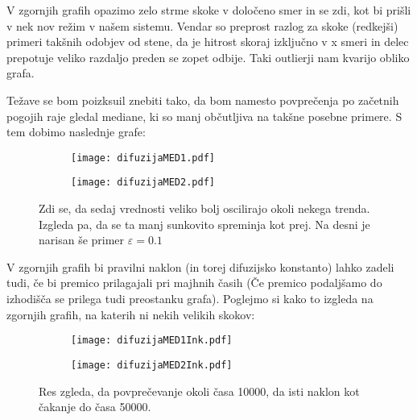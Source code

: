 \documentclass{article}
\begin{document}
V zgornjih grafih opazimo zelo strme skoke v določeno smer in se zdi, kot bi prišli v nek nov režim v našem sistemu. Vendar so preprost razlog za skoke (redkejši) primeri takšnih odobjev od stene, da je hitrost skoraj izključno v x smeri in delec prepotuje veliko razdaljo preden se zopet odbije. Taki outlierji nam kvarijo obliko grafa.

Težave se bom poizksuil znebiti tako, da bom namesto povprečenja po začetnih pogojih raje gledal mediane, ki so manj občutljiva na takšne posebne primere. S tem dobimo naslednje grafe:

\begin{figure}[H]
\centering
\begin{subfigure}{.49\textwidth}
\texttt{[image: difuzijaMED1.pdf]}
\end{subfigure}
\begin{subfigure}{.49\textwidth}
\texttt{[image: difuzijaMED2.pdf]}
\end{subfigure}
\caption*{Zdi se, da sedaj vrednosti veliko bolj oscilirajo okoli nekega trenda. Izgleda pa, da se ta manj sunkovito spreminja kot prej. Na desni je narisan še primer $\varepsilon=0.1$}
\end{figure}

V zgornjih grafih bi pravilni naklon (in torej difuzijsko konstanto) lahko zadeli tudi, če bi premico prilagajali pri majhnih časih (Če premico podaljšamo do izhodišča se prilega tudi preostanku grafa). Poglejmo si kako to izgleda na zgornjih grafih, na katerih ni nekih velikih skokov:

\begin{figure}[H]
\centering
\begin{subfigure}{.49\textwidth}
\texttt{[image: difuzijaMED1Ink.pdf]}
\end{subfigure}
\begin{subfigure}{.49\textwidth}
\texttt{[image: difuzijaMED2Ink.pdf]}
\end{subfigure}
\caption*{Res zgleda, da povprečevanje okoli časa 10000, da isti naklon kot čakanje do časa 50000.}
\end{figure}
\end{document}
